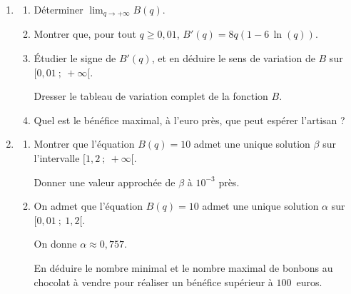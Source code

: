 \begin{enumerate}
\item 
	\begin{enumerate}
		\item Déterminer $\displaystyle\lim_{q \to +\infty}B(q)$.
		\item Montrer que, pour tout $q \geqslant 0,01$,\: $B'(q) = 8q(1 - 6\,\ln (q))$.
		\item Étudier le signe de $B'(q)$, et en déduire le sens de variation de $B$ sur $[0,01~;~+\infty[$.

Dresser le tableau de variation complet de la fonction $B$.
		\item Quel est le bénéfice maximal, à l'euro près, que peut espérer l'artisan ?
	\end{enumerate}
\item 
	\begin{enumerate}
		\item Montrer que l'équation $B(q)= 10$ admet une unique solution $\beta$ sur l'intervalle $[1,2~;~+\infty[$.
		
		Donner une valeur approchée de $\beta$ à $10^{-3}$ près.
		\item On admet que l'équation $B(q)= 10$ admet une unique solution $\alpha$ sur $[0,01~;~1,2[$.
		
On donne $\alpha \approx 0,757$.
		
		En déduire le nombre minimal et le nombre maximal de bonbons au chocolat à vendre pour réaliser un bénéfice supérieur à $100$~euros.
	\end{enumerate}
\end{enumerate}

\bigskip
